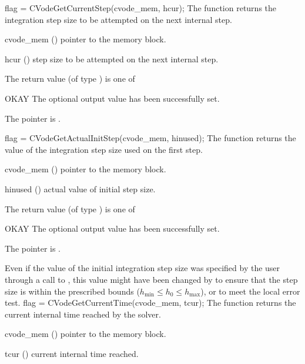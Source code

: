 {}
{
  flag = CVodeGetCurrentStep(cvode\_mem, hcur);
}
{
  The function  returns the
  integration step size to be attempted on the next internal step.
}
{
  \begin{args}
  \item[cvode\_mem] ()
    pointer to the {\cvode} memory block.
  \item[hcur] ()
    step size to be attempted on the next internal step.
  \end{args}
}
{
  The return value  (of type ) is one of
  \begin{args}
  \item[OKAY] 
    The optional output value has been successfully set.
  \item[\Id{CVG\_NO\_MEM}]
    The  pointer is .
  \end{args}
}
{}
{
  flag = CVodeGetActualInitStep(cvode\_mem, hinused);
}
{
  The function  returns the
  value of the integration step size used on the first step.
}
{
  \begin{args}
  \item[cvode\_mem] ()
    pointer to the {\cvode} memory block.
  \item[hinused] ()
    actual value of initial step size.
  \end{args}
}
{
  The return value  (of type ) is one of
  \begin{args}
  \item[OKAY] 
    The optional output value has been successfully set.
  \item[\Id{CVG\_NO\_MEM}]
    The  pointer is .
  \end{args}
}
{
  Even if the value of the initial integration step size was specified
  by the user through a call to , this value might have 
  been changed by {\cvode} to ensure that the step size is within the 
  prescribed bounds ($h_{\min} \le h_0 \le h_{\max}$), or to meet the
  local error test.
}
{
  flag = CVodeGetCurrentTime(cvode\_mem, tcur);
}
{
  The function  returns the
  current internal time reached by the solver.
}
{
  \begin{args}
  \item[cvode\_mem] ()
    pointer to the {\cvode} memory block.
  \item[tcur] ()
    current internal time reached.
  \end{args}
}
